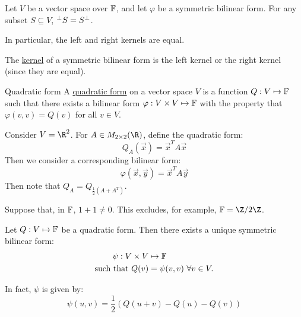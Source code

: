 \documentclass[../Main.tex]{subfiles}
\begin{document}
\begin{proposition}
    Let $V$ be a vector space over $\mathbb{F}$, and let $\varphi$ be a symmetric bilinear form.
    For any subset $S \subseteq V$, ${}^\perp {S} = S^\perp$.

    In particular, the left and right kernels are equal.
    \label{propBFSymPerpendicular}
\end{proposition}
The \underline{kernel} of a symmetric bilinear form is the left kernel or the right kernel (since they are equal).
\begin{definition}{Quadratic form}
    A \underline{quadratic form} on a vector space $V$ is a function $Q : V \mapsto \mathbb{F}$ such that there exists a bilinear form $\varphi : V \times V \mapsto \mathbb{F}$ with the property that $\varphi(v, v) = Q(v)$ for all $v \in V$.
\end{definition}
\begin{example}
    Consider $V = \R^2$. For $A \in M_{2 \times 2}(\R)$, define the quadratic form:
    \begin{equation*}
        Q_A(\vec{x}) = \vec{x}^T A \vec{x}
    \end{equation*}
    Then we consider a corresponding bilinear form:
    \begin{equation*}
        \varphi(\vec{x}, \vec{y}) = \vec{x}^T A \vec{y}
    \end{equation*}
    Then note that $Q_A = Q_{\frac12 (A + A^T)}$.
\end{example}
\begin{proposition}
    Suppose that, in $\mathbb{F}$, $1 + 1 \neq 0$. This excludes, for example, $\F = \Z / 2\Z$.

    Let $Q : V \mapsto \mathbb{F}$ be a quadratic form. Then there exists a unique symmetric bilinear form:
    \begin{equation}
        \begin{split}
            \psi : V \times V &\mapsto \mathbb{F} \\
            \text{such that } Q(v) &= \psi(v, v)~\forall v \in V.
        \end{split}
        \label{eqnBFSymDef}
    \end{equation}

    In fact, $\psi$ is given by:
    \begin{equation}
        \psi(u, v) = \frac12 \left(Q(u + v) - Q(u) - Q(v)\right)
        \label{eqnPolarisationId}
    \end{equation}
    \label{propPolarisationId}
\end{proposition}
\end{document}
